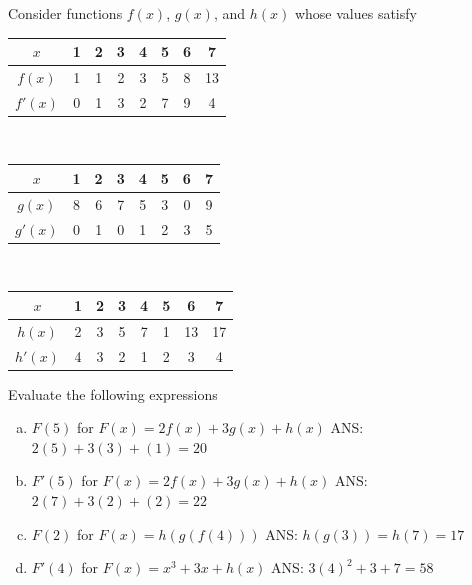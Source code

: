 \documentclass[11pt]{exam}
\theoremstyle{definition}
\begin{document}
\begin{questions}
\newpage
\question[8]\mbox{}
Consider functions $f(x)$, $g(x)$, and $h(x)$ whose values satisfy
\begin{center}
\begin{tabular}{c|c|c|c|c|c|c|c}
$x$ & 1 & 2 & 3 & 4 & 5 & 6 & 7\\\hline
$f(x)$ & 1 & 1 & 2 & 3 & 5 & 8 & 13\\\hline
$f'(x)$ & 0 & 1 & 3 & 2 & 7 & 9 & 4\\\hline
\end{tabular}\\
\vspace{0.3in}
\begin{tabular}{c|c|c|c|c|c|c|c}
$x$ & 1 & 2 & 3 & 4 & 5 & 6 & 7\\\hline
$g(x)$ & 8 & 6 & 7 & 5 & 3 & 0 & 9\\\hline
$g'(x)$ & 0 & 1 & 0 & 1 & 2 & 3 & 5
\end{tabular}\\
\vspace{0.3in}
\begin{tabular}{c|c|c|c|c|c|c|c}
$x$ & 1 & 2 & 3 & 4 & 5 & 6 & 7\\\hline
$h(x)$ & 2 & 3 & 5 & 7 & 1 & 13 & 17\\\hline
$h'(x)$ & 4 & 3 & 2 & 1 & 2 & 3 & 4
\end{tabular}
\end{center}
Evaluate the following expressions
\begin{enumerate}[(a)]
\item $F(5)$ for $F(x) = 2f(x)+3g(x) + h(x)$ ANS: $2(5)+3(3) + (1) = 20$
\vspace{1in}
\item $F'(5)$ for $F(x) = 2f(x)+3g(x) + h(x)$ ANS: $2(7)+3(2) + (2) = 22$
\vspace{1in}
\item $F(2)$ for $F(x) = h(g(f(4)))$ ANS: $h(g(3))=h(7)=17$
\vspace{1in}
\item $F'(4)$ for $F(x) = x^3 + 3x + h(x)$ ANS: $3(4)^2+3+7=58$
\end{enumerate}



\end{questions}
\end{document}
